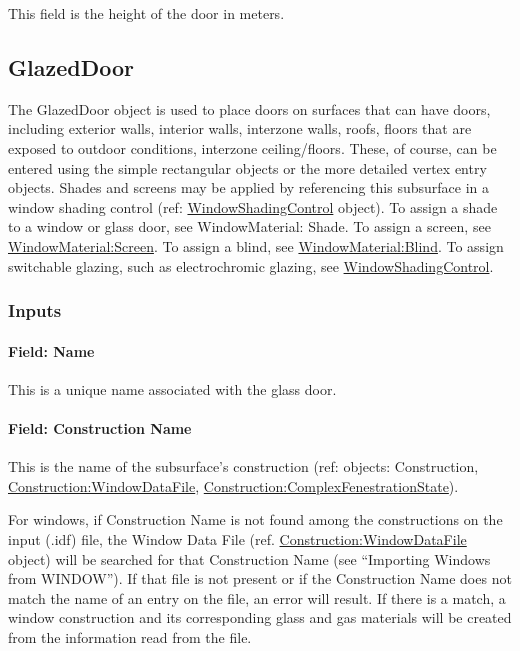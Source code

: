 This field is the height of the door in meters.

\subsection{GlazedDoor}\label{glazeddoor}

The GlazedDoor object is used to place doors on surfaces that can have doors, including exterior walls, interior walls, interzone walls, roofs, floors that are exposed to outdoor conditions, interzone ceiling/floors. These, of course, can be entered using the simple rectangular objects or the more detailed vertex entry objects. Shades and screens may be applied by referencing this subsurface in a window shading control (ref: \hyperref[windowpropertyshadingcontrol]{WindowShadingControl} object). To assign a shade to a window or glass door, see WindowMaterial: Shade. To assign a screen, see \hyperref[windowmaterialscreen]{WindowMaterial:Screen}. To assign a blind, see \hyperref[windowmaterialblind]{WindowMaterial:Blind}. To assign switchable glazing, such as electrochromic glazing, see \hyperref[windowpropertyshadingcontrol]{WindowShadingControl}.

\subsubsection{Inputs}\label{inputs-16-012}

\paragraph{Field: Name}\label{field-name-12-012}

This is a unique name associated with the glass door.

\paragraph{Field: Construction Name}\label{field-construction-name-12}

This is the name of the subsurface's construction (ref: objects: Construction, \hyperref[constructionwindowdatafile]{Construction:WindowDataFile}, \hyperref[constructioncomplexfenestrationstate]{Construction:ComplexFenestrationState}).

For windows, if Construction Name is not found among the constructions on the input (.idf) file, the Window Data File (ref. \hyperref[constructionwindowdatafile]{Construction:WindowDataFile} object) will be searched for that Construction Name (see ``Importing Windows from WINDOW''). If that file is not present or if the Construction Name does not match the name of an entry on the file, an error will result. If there is a match, a window construction and its corresponding glass and gas materials will be created from the information read from the file.

